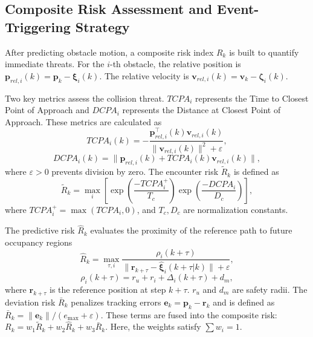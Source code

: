 \documentclass[lettersize,journal]{IEEEtran}
\newcommand{\vect}[1]{\boldsymbol{#1}}
\begin{document}
\subsection{Composite Risk Assessment and Event-Triggering Strategy}

After predicting obstacle motion, a composite risk index $R_k$ is built to quantify immediate threats. For the $i$-th obstacle, the relative position is $\vect{p}_{rel,i}(k) = \vect{p}_k - \vect{\xi}_i(k)$. The relative velocity is $\vect{v}_{rel,i}(k) = \vect{v}_k - \vect{\zeta}_i(k)$. 

Two key metrics assess the collision threat. $TCPA_i$ represents the Time to Closest Point of Approach and $DCPA_i$ represents the Distance at Closest Point of Approach. These metrics are calculated as
\begin{equation}
	TCPA_i(k) = -\frac{\vect{p}_{rel,i}^{\top}(k)\vect{v}_{rel,i}(k)}{\|\vect{v}_{rel,i}(k)\|^2+\varepsilon},
	\label{eq:tcpa}
\end{equation}
\begin{equation}
	DCPA_i(k) = \|\vect{p}_{rel,i}(k)+TCPA_i(k)\vect{v}_{rel,i}(k)\|,
	\label{eq:dcpa}
\end{equation}
where $\varepsilon > 0$ prevents division by zero. The encounter risk $\tilde{R}_k$ is defined as
\begin{equation}
	\tilde{R}_k = \max_i \left[ \exp \left( \frac{-TCPA_i^{+}}{T_c} \right) \exp \left( \frac{-DCPA_i}{D_c} \right) \right],
	\label{eq:rtcpa}
\end{equation}
where $TCPA_i^{+} = \max(TCPA_i,0)$, and $T_c, D_c$ are normalization constants.

The predictive risk $\hat{R}_k$ evaluates the proximity of the reference path to future occupancy regions
\begin{equation}
	\hat{R}_k = \max_{\tau, i} \frac{\rho_i(k+\tau)}{\|\vect{r}_{k+\tau}-\hat{\vect{\xi}}_i(k+\tau|k)\|+\varepsilon},
	\label{eq:rpred}
\end{equation}
\begin{equation}
	\rho_i(k+\tau) = r_u+r_i+\Delta_i(k+\tau)+d_m,
	\label{eq:rho}
\end{equation}
where $\vect{r}_{k+\tau}$ is the reference position at step $k+\tau$. $r_u$ and $d_m$ are safety radii. The deviation risk $\bar{R}_k$ penalizes tracking errors $\vect{e}_k = \vect{p}_k - \vect{r}_k$ and is defined as $\bar{R}_k = \|\vect{e}_k\| / (e_{\max} + \varepsilon)$. These terms are fused into the composite risk: $R_k = w_1 \tilde{R}_k + w_2 \hat{R}_k + w_3 \bar{R}_k$. Here, the weights satisfy $\sum w_i = 1$.
\end{document}
